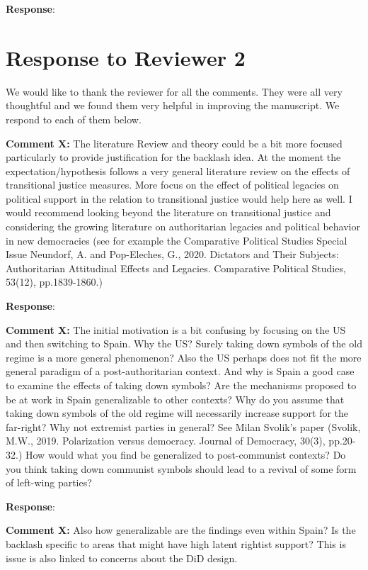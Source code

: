 \documentclass[12pt, a4paper, notitlepage]{article}
\begin{document}
\textbf{Response}: {\color{red}{pending}}

\newpage
\section*{Response to Reviewer 2}

We would like to thank the reviewer for all the comments. They were all very thoughtful and we found them very helpful in improving the manuscript. We respond to each of them below.

\textbf{Comment X:} The literature Review and theory could be a bit more focused particularly to provide justification for the backlash idea. At the moment the expectation/hypothesis follows a very general literature review on the effects of transitional justice measures. More focus on the effect of political legacies on political support in the relation to transitional justice would help here as well. I would recommend looking beyond the literature on transitional justice and considering the growing literature on authoritarian legacies and political behavior in new democracies (see for example the Comparative Political Studies Special Issue Neundorf, A. and Pop-Eleches, G., 2020. Dictators and Their Subjects: Authoritarian Attitudinal Effects and Legacies. Comparative Political Studies, 53(12), pp.1839-1860.)

\textbf{Response}: {\color{red}{pending}}

\textbf{Comment X:} The initial motivation is a bit confusing by focusing on the US and then switching to Spain. Why the US? Surely taking down symbols of the old regime is a more general phenomenon? Also the US perhaps does not fit the more general paradigm of a post-authoritarian context. And why is Spain a good case to examine the effects of taking down symbols? Are the mechanisms proposed to be at work in Spain generalizable to other contexts? Why do you assume that taking down symbols of the old regime will necessarily increase support for the far-right? Why not extremist parties in general? See Milan Svolik’s paper (Svolik, M.W., 2019. Polarization versus democracy. Journal of Democracy, 30(3), pp.20-32.) How would what you find be generalized to post-communist contexts? Do you think taking down communist symbols should lead to a revival of some form of left-wing parties?

\textbf{Response}: {\color{red}{pending}}

\textbf{Comment X:} Also how generalizable are the findings even within Spain? Is the backlash specific to areas that might have high latent rightist support? This is issue is also linked to concerns about the DiD design.
\end{document}
